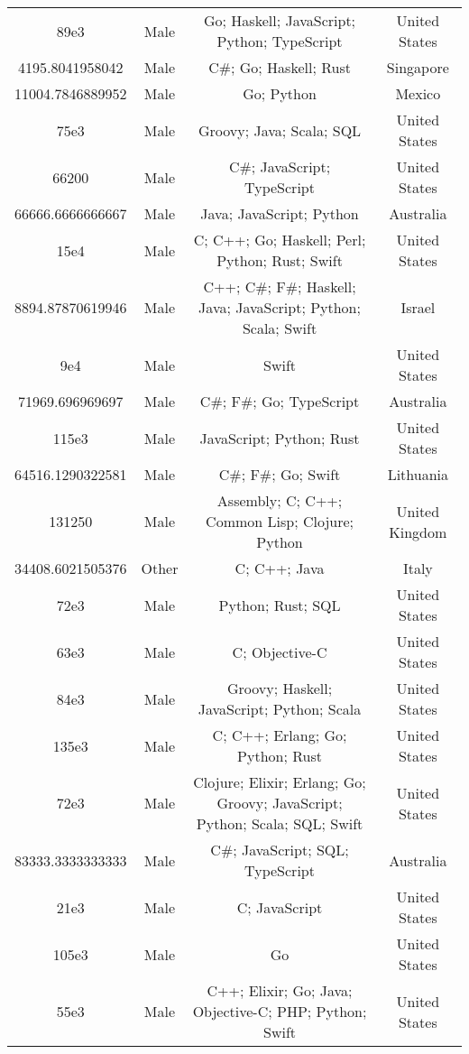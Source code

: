 \begin{center}
\begin{tabular}{ |c|c|c|c| }
89e3  &  Male  &  Go; Haskell; JavaScript; Python; TypeScript  &  United States  \\ 
4195.8041958042  &  Male  &  C\#; Go; Haskell; Rust  &  Singapore  \\ 
11004.7846889952  &  Male  &  Go; Python  &  Mexico  \\ 
75e3  &  Male  &  Groovy; Java; Scala; SQL  &  United States  \\ 
66200  &  Male  &  C\#; JavaScript; TypeScript  &  United States  \\ 
66666.6666666667  &  Male  &  Java; JavaScript; Python  &  Australia  \\ 
15e4  &  Male  &  C; C++; Go; Haskell; Perl; Python; Rust; Swift  &  United States  \\ 
8894.87870619946  &  Male  &  C++; C\#; F\#; Haskell; Java; JavaScript; Python; Scala; Swift  &  Israel  \\ 
9e4  &  Male  &  Swift  &  United States  \\ 
71969.696969697  &  Male  &  C\#; F\#; Go; TypeScript  &  Australia  \\ 
115e3  &  Male  &  JavaScript; Python; Rust  &  United States  \\ 
64516.1290322581  &  Male  &  C\#; F\#; Go; Swift  &  Lithuania  \\ 
131250  &  Male  &  Assembly; C; C++; Common Lisp; Clojure; Python  &  United Kingdom  \\ 
34408.6021505376  &  Other  &  C; C++; Java  &  Italy  \\ 
72e3  &  Male  &  Python; Rust; SQL  &  United States  \\ 
63e3  &  Male  &  C; Objective-C  &  United States  \\ 
84e3  &  Male  &  Groovy; Haskell; JavaScript; Python; Scala  &  United States  \\ 
135e3  &  Male  &  C; C++; Erlang; Go; Python; Rust  &  United States  \\ 
72e3  &  Male  &  Clojure; Elixir; Erlang; Go; Groovy; JavaScript; Python; Scala; SQL; Swift  &  United States  \\ 
83333.3333333333  &  Male  &  C\#; JavaScript; SQL; TypeScript  &  Australia  \\ 
21e3  &  Male  &  C; JavaScript  &  United States  \\ 
105e3  &  Male  &  Go  &  United States  \\ 
55e3  &  Male  &  C++; Elixir; Go; Java; Objective-C; PHP; Python; Swift  &  United States  \\ 

\end{tabular}
\end{center}
